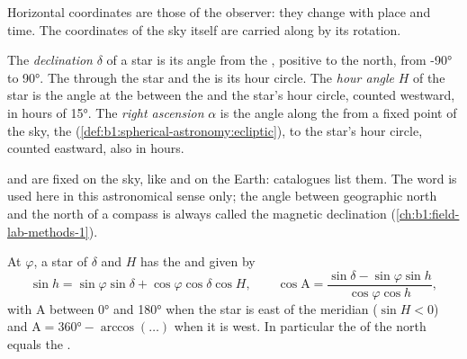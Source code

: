 Horizontal coordinates are those of the observer: they change with place and
time. The coordinates of the sky itself are carried along by its rotation.

\begin{definition}\label{def:b1:spherical-astronomy:equatorial}
The \emph{declination} $\delta$ of a star is
its angle from the , positive to the north, from \ang{-90}
to \ang{90}. The  through the star and the  is its
hour circle. The \emph{hour angle} $H$ of the star is the
angle at the  between the  and the star's hour
circle, counted westward, in hours of \ang{15}. The \emph{right
ascension} $\alpha$ is the angle along the  from a fixed point of the sky, the 
(\cref{def:b1:spherical-astronomy:ecliptic}), to the star's hour circle,
counted eastward, also in hours.
\end{definition}

 and  are fixed on the sky, like  and
 on the Earth: catalogues list them. The word  is used
here in this astronomical sense only; the angle between geographic north and
the north of a compass is always called the magnetic declination
(\cref{ch:b1:field-lab-methods-1}).

\begin{proposition}\label{prop:b1:spherical-astronomy:transform}
At  $\varphi$, a star of  $\delta$ and  $H$ has
the  and  given by
\[
  \sin h = \sin\varphi\sin\delta + \cos\varphi\cos\delta\cos H,
  \qquad
  \cos\mathrm{A} = \frac{\sin\delta - \sin\varphi\sin h}{\cos\varphi\cos h},
\]
with $\mathrm{A}$ between \ang{0} and \ang{180} when the star is east of the
meridian ($\sin H < 0$) and $\mathrm{A} = \ang{360} - \arccos(\dots)$ when it
is west. In particular the  of the north  equals the
.
\end{proposition}

